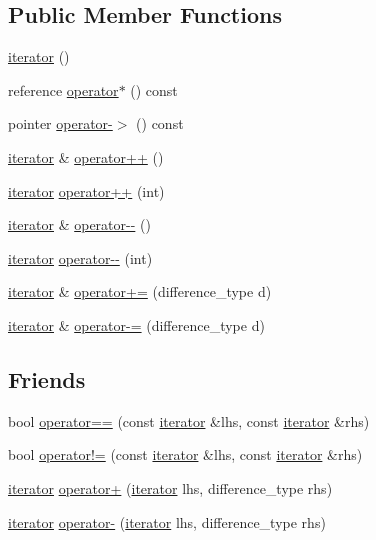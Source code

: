 \subsection*{Public Member Functions}
\begin{DoxyCompactItemize}
\item 
\hyperlink{classmy__deque_1_1iterator_acfdc483e598073a09964a7ae43a8da93}{iterator} ()
\item 
reference \hyperlink{classmy__deque_1_1iterator_a12632f02814bba64ca79f42edc0e1497}{operator$\ast$} () const 
\item 
pointer \hyperlink{classmy__deque_1_1iterator_a064f5b1faf5a72113083425133de9a41}{operator-\/$>$} () const 
\item 
\hyperlink{classmy__deque_1_1iterator}{iterator} \& \hyperlink{classmy__deque_1_1iterator_ab2a00619614e204eedb184112a56016e}{operator++} ()
\item 
\hyperlink{classmy__deque_1_1iterator}{iterator} \hyperlink{classmy__deque_1_1iterator_a57f6ac4aef7215ca67b6e05eeda29ee4}{operator++} (int)
\item 
\hyperlink{classmy__deque_1_1iterator}{iterator} \& \hyperlink{classmy__deque_1_1iterator_a278cab96c03498e55ba1aa4e05f1538e}{operator-\/-\/} ()
\item 
\hyperlink{classmy__deque_1_1iterator}{iterator} \hyperlink{classmy__deque_1_1iterator_a5bef4b6332aecf7dcda57cee9a1fdc70}{operator-\/-\/} (int)
\item 
\hyperlink{classmy__deque_1_1iterator}{iterator} \& \hyperlink{classmy__deque_1_1iterator_ad17b4f6e8be4d8242ad4572d62beff82}{operator+=} (difference\-\_\-type d)
\item 
\hyperlink{classmy__deque_1_1iterator}{iterator} \& \hyperlink{classmy__deque_1_1iterator_a13c056d48543734a23a9de09fd652868}{operator-\/=} (difference\-\_\-type d)
\end{DoxyCompactItemize}
\subsection*{Friends}
\begin{DoxyCompactItemize}
\item 
bool \hyperlink{classmy__deque_1_1iterator_a27d0df37bd079bf4e62faa0b468b060c}{operator==} (const \hyperlink{classmy__deque_1_1iterator}{iterator} \&lhs, const \hyperlink{classmy__deque_1_1iterator}{iterator} \&rhs)
\item 
bool \hyperlink{classmy__deque_1_1iterator_aad2b3926ed1e2db6f22ca3117766181b}{operator!=} (const \hyperlink{classmy__deque_1_1iterator}{iterator} \&lhs, const \hyperlink{classmy__deque_1_1iterator}{iterator} \&rhs)
\item 
\hyperlink{classmy__deque_1_1iterator}{iterator} \hyperlink{classmy__deque_1_1iterator_aaf128f38c16b5a8284f51a9c69f6fd77}{operator+} (\hyperlink{classmy__deque_1_1iterator}{iterator} lhs, difference\-\_\-type rhs)
\item 
\hyperlink{classmy__deque_1_1iterator}{iterator} \hyperlink{classmy__deque_1_1iterator_ab8892736ecb2ffe5f6b9ac9b9dbb60c0}{operator-\/} (\hyperlink{classmy__deque_1_1iterator}{iterator} lhs, difference\-\_\-type rhs)
\end{DoxyCompactItemize}


